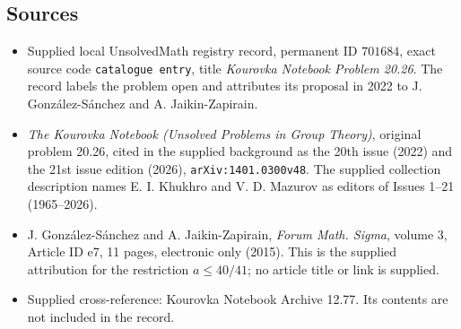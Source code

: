 \documentclass[11pt]{article}
\begin{document}
\subsection{Sources}
\begin{itemize}
\item Supplied local UnsolvedMath registry record, permanent ID \(701684\), exact source code \texttt{catalogue entry}, title \emph{Kourovka Notebook Problem 20.26}. The record labels the problem open and attributes its proposal in 2022 to J. Gonz\'alez-S\'anchez and A. Jaikin-Zapirain.
\item \emph{The Kourovka Notebook (Unsolved Problems in Group Theory)}, original problem 20.26, cited in the supplied background as the 20th issue (2022) and the 21st issue edition (2026), \texttt{arXiv:1401.0300v48}. The supplied collection description names E. I. Khukhro and V. D. Mazurov as editors of Issues 1--21 (1965--2026).
\item J. Gonz\'alez-S\'anchez and A. Jaikin-Zapirain, \emph{Forum Math. Sigma}, volume 3, Article ID e7, 11 pages, electronic only (2015). This is the supplied attribution for the restriction \(a\leq 40/41\); no article title or link is supplied.
\item Supplied cross-reference: Kourovka Notebook Archive 12.77. Its contents are not included in the record.
\end{itemize}
\end{document}
